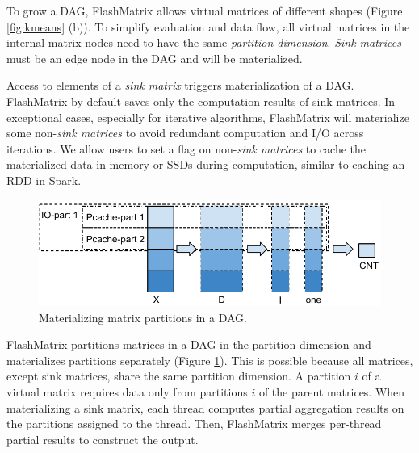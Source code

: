 To grow a DAG, FlashMatrix allows virtual matrices of different shapes
(Figure \ref{fig:kmeans} (b)). To simplify evaluation and data flow, 
all virtual matrices in the internal matrix nodes need to have the same
\textit{partition dimension}. \textit{Sink matrices} must be an edge node
in the DAG and will be materialized.

Access to elements of a \textit{sink matrix} triggers materialization of a DAG.
FlashMatrix by default saves only the computation results of sink matrices.
In exceptional cases, especially for iterative algorithms,
FlashMatrix will materialize some non-\textit{sink matrices} to avoid
redundant computation and I/O across iterations.  We allow users to
set a flag on non-\textit{sink matrices} to cache the materialized data in memory
or SSDs during computation, similar to caching an RDD in Spark.

\begin{figure}
	\centering
	\includegraphics[scale=0.6]{FlashMatrix_figs/materialize.pdf}
  \vspace{-4pt}
	\caption{Materializing matrix partitions in a DAG.}
	\label{fig:mater}
  \vspace{-8pt}
\end{figure}

FlashMatrix partitions matrices in a DAG in the partition dimension and
materializes partitions separately (Figure \ref{fig:mater}). This is possible
because all matrices, except sink matrices, share the same partition dimension. 
A partition $i$ of a virtual matrix requires data only from partitions
$i$ of the parent matrices.
When materializing a sink matrix, each thread computes partial
aggregation results on the partitions assigned to the thread. 
Then, FlashMatrix merges per-thread partial results to construct the output.

